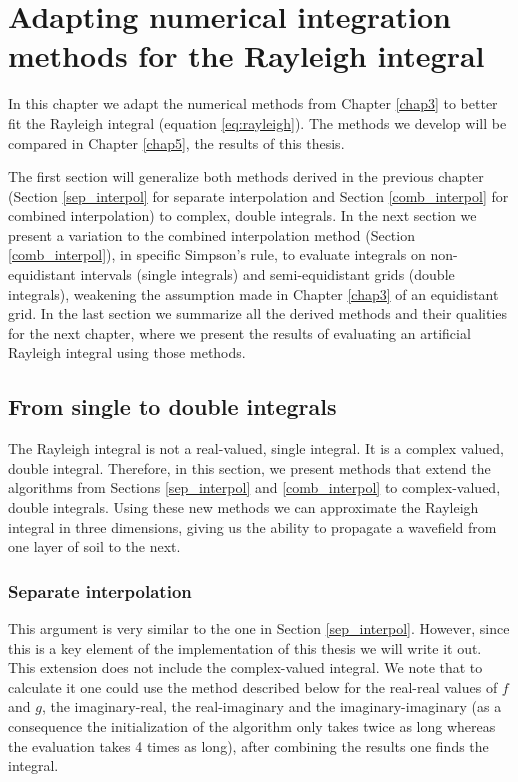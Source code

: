 \chapter{Adapting numerical integration methods for the Rayleigh integral}
\label{chap4}
In this chapter we adapt the numerical methods from Chapter \ref{chap3} to better fit the Rayleigh integral (equation \ref{eq:rayleigh}).
The methods we develop will be compared in Chapter \ref{chap5}, the results of this thesis.

The first section will generalize both methods derived in the previous chapter (Section \ref{sep_interpol} for separate interpolation and Section \ref{comb_interpol} for combined interpolation) to complex, double integrals.
In the next section we present a variation to the combined interpolation method (Section \ref{comb_interpol}), in specific Simpson's rule, to evaluate integrals on non-equidistant intervals (single integrals) and semi-equidistant grids (double integrals), weakening the assumption made in Chapter \ref{chap3} of an equidistant grid.
In the last section we summarize all the derived methods and their qualities for the next chapter, where we present the results of evaluating an artificial Rayleigh integral using those methods.

\section{From single to double integrals}
The Rayleigh integral is not a real-valued, single integral. It is a complex valued, double integral.
Therefore, in this section, we present methods that extend the algorithms from Sections \ref{sep_interpol} and \ref{comb_interpol} to complex-valued, double integrals.
Using these new methods we can approximate the Rayleigh integral in three dimensions, giving us the ability to propagate a wavefield from one layer of soil to the next.

\subsection{Separate interpolation}
\label{sep_interpol_3d}
This argument is very similar to the one in Section \ref{sep_interpol}.
However, since this is a key element of the implementation of this thesis we will write it out.
This extension does not include the complex-valued integral.
We note that to calculate it one could use the method described below for the real-real values of $f$ and $g$, the imaginary-real, the real-imaginary and the imaginary-imaginary (as a consequence the initialization of the algorithm only takes twice as long whereas the evaluation takes 4 times as long), after combining the results one finds the integral.

